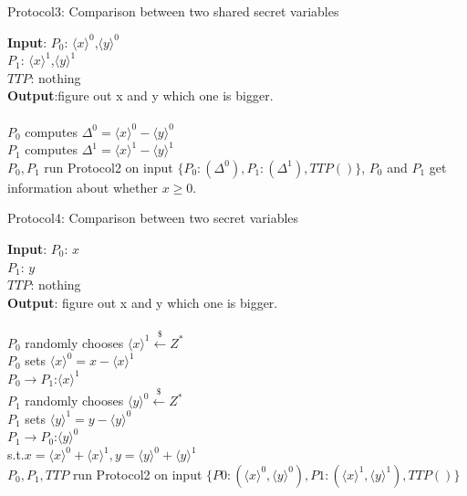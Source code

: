 \documentclass[11pt,twoside,a4paper]{article}
\begin{document}
\begin{algorithm}[htbp]
	\caption{Protocol3: Comparison between two shared secret variables}
	\textbf{Input}: $P_{0}$: $\langle x\rangle ^{0}$,$\langle y\rangle ^{0}$\\
	$P_{1}$: $\langle x\rangle ^{1}$,$\langle y\rangle ^{1}$\\
	$TTP$: nothing\\
	\textbf{Output}:figure out x and y which one is bigger.\\
	~\\
	$P_{0}$ computes $\Delta^{0}=\langle x\rangle ^{0}-\langle y\rangle ^{0}$\\
	$P_{1}$ computes $\Delta^{1}=\langle x\rangle ^{1}-\langle y\rangle ^{1}$\\
	$P_{0}, P_{1}$ run Protocol2 on input $\{P_{0}:(\Delta^{0}), P_{1}:(\Delta^{1}), TTP()\}$, $P_{0}$ and $P_{1}$ get information about whether $x\ge 0$.\\

\end{algorithm}

\begin{algorithm}[htbp]
	\caption{Protocol4: Comparison between two secret variables}
	\textbf{Input}: $P_{0}$: $x$\\
	$P_{1}$: $y$\\
	$TTP$: nothing\\
	\textbf{Output}: figure out x and y which one is bigger.\\
	~\\
	$P_{0}$ randomly chooses $\langle x\rangle ^{1}\xleftarrow{\$}Z^{*}$\\
	$P_{0}$ sets $\langle x\rangle ^{0}=x-\langle x\rangle ^{1}$\\
	$P_{0}\rightarrow P_{1}$:$\langle x\rangle ^{1}$\\
	$P_{1}$ randomly chooses $\langle y\rangle ^{0}\xleftarrow{\$}Z^{*}$\\
	$P_{1}$ sets $\langle y\rangle ^{1}=y-\langle y\rangle ^{0}$\\
	$P_{1}\rightarrow P_{0}$:$\langle y\rangle ^{0}$\\
	s.t.$x=\langle x\rangle ^{0}+\langle x\rangle ^{1}, y=\langle y\rangle ^{0}+\langle y\rangle ^{1}$\\
	$P_{0}, P_{1}, TTP$ run Protocol2 on input $\{P0:(\langle x\rangle ^{0},\langle y\rangle ^{0}), P1:(\langle x\rangle ^{1},\langle y\rangle ^{1}), TTP()\}  $\\
	
\end{algorithm}
\end{document}
